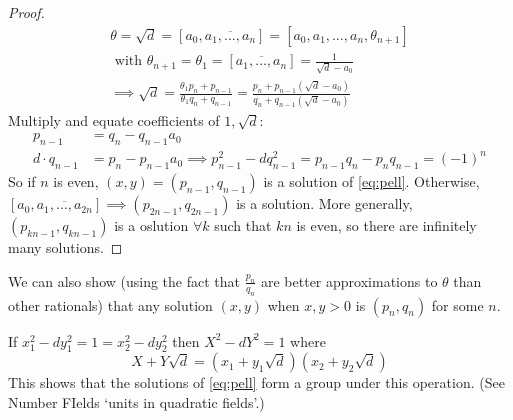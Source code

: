 \documentclass{article}
\begin{document}
\begin{proof}
    \begin{gather*}
        \theta = \sqrt{d} = [a_0, \overline{a_1, \dotsc, a_n}] = [a_0, a_1, \dotsc, a_n, \theta_{n+1}]\\ \text{ with } \theta_{n+1} = \theta_1 = [\overline{a_1, \dotsc, a_n}] = \frac{1}{\sqrt{d} - a_0} \\
        \implies \sqrt{d} = \frac{\theta_1 p_n + p_{n-1}}{\theta_1 q_n + q_{n-1}} = \frac{p_n + p_{n-1} (\sqrt{d} - a_0)}{q_n + q_{n-1} (\sqrt{d} - a_0)}
    \end{gather*}
    Multiply and equate coefficients of $1, \sqrt{d}$:
    \begin{align*}
        p_{n-1} &= q_n - q_{n-1} a_0 \\
        d \cdot q_{n-1} &= p_n - p_{n-1} a_0
        \implies p_{n-1}^2 - d q_{n-1}^2 = p_{n-1} q_n - p_n q_{n-1} = (-1)^n
    \end{align*}
    So if $n$ is even, $(x, y) = (p_{n-1}, q_{n-1})$ is a solution of \eqref{eq:pell}.
    Otherwise, $[a_0, \overline{a_1, \dotsc, a_{2n}}] \implies (p_{2n-1}, q_{2n-1})$ is a solution.
    More generally, $(p_{kn-1}, q_{kn-1})$ is a oslution $\forall k$ such that $kn$ is even, so there are infinitely many solutions.
\end{proof}

\begin{remark}
    We can also show (using the fact that $\frac{p_n}{q_n}$ are better approximations to $\theta$ than other rationals) that any solution $(x, y)$ when $x, y > 0$ is $(p_n, q_n)$ for some $n$.
\end{remark}

\begin{remark}
    If $x_1^2 - d y_1^2 = 1 = x_2^2 - d y_2^2$ then $X^2 - d Y^2 = 1$ where
    \begin{equation*}
        X + Y \sqrt{d} = (x_1 + y_1 \sqrt{d})(x_2 + y_2 \sqrt{d})
    \end{equation*}
    This shows that the solutions of \eqref{eq:pell} form a group under this operation. (See Number FIelds `units in quadratic fields'.)
\end{remark}

\end{document}
